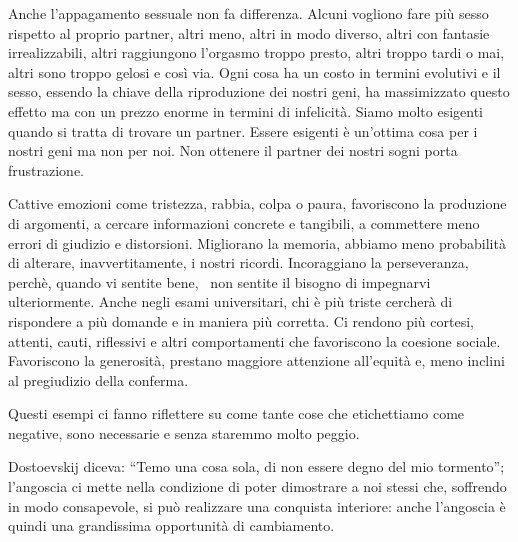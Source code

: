 \documentclass[12pt]{book} %
\begin{document}
\begin{mdframed}[linewidth=1pt]
Anche l'appagamento sessuale non fa differenza. Alcuni vogliono fare più sesso rispetto al proprio
partner, altri meno, altri in modo diverso, altri con fantasie irrealizzabili, altri raggiungono
l'orgasmo troppo presto, altri troppo tardi o mai, altri sono troppo gelosi e così via. Ogni cosa
ha un costo in termini evolutivi e il sesso, essendo la chiave della riproduzione dei nostri geni, ha massimizzato
questo effetto ma con un prezzo enorme in termini di infelicità. Siamo molto esigenti quando si tratta di trovare un
partner. Essere esigenti è un'ottima cosa per i nostri geni ma non per noi. Non ottenere il
partner dei nostri sogni porta frustrazione.

Cattive emozioni come tristezza, rabbia, colpa o paura, favoriscono la produzione di
argomenti, a cercare informazioni
concrete e tangibili, a commettere meno errori di giudizio e distorsioni. Migliorano la memoria, abbiamo meno
probabilità di alterare, inavvertitamente, i nostri ricordi. Incoraggiano la perseveranza, perchè, quando vi sentite
bene, \ non sentite il bisogno di impegnarvi ulteriormente. Anche negli esami universitari, chi è più triste cercherà
di rispondere a più domande e in maniera più corretta. Ci rendono più cortesi, attenti, cauti, riflessivi e altri
comportamenti che favoriscono la coesione
sociale. Favoriscono la generosità, prestano
maggiore attenzione all'equità e, meno inclini al pregiudizio della conferma.

Questi esempi ci fanno riflettere su come tante cose che etichettiamo come negative, sono necessarie e senza staremmo
molto peggio.

Dostoevskij diceva: “Temo una cosa sola, di non essere degno del mio tormento”; l'angoscia ci mette
nella condizione di poter dimostrare a noi stessi che, soffrendo in modo consapevole, si può realizzare una conquista
interiore: anche l'angoscia è quindi una grandissima opportunità di cambiamento. 


\end{mdframed}
\end{document}
